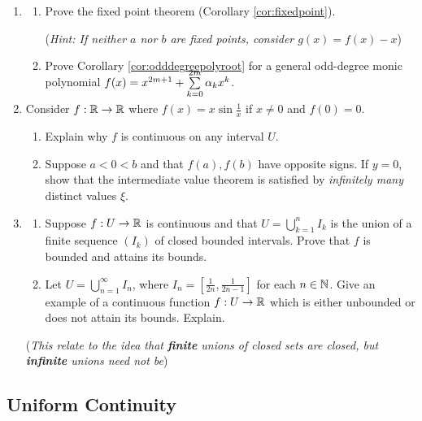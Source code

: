 \begin{exercises}{}{}
\begin{enumerate}
	  
	 	\item\begin{enumerate}
	 	  \item Prove the fixed point theorem (Corollary \ref{cor:fixedpoint}).\par
	 	  (\emph{Hint: If neither $a$ nor $b$ are fixed points, consider $g(x)=f(x)-x$}) 
	 	  
	 	  \item Prove Corollary \ref{cor:odddegreepolyroot} for a general odd-degree monic polynomial $f(x)=x^{2m+1}+\smash{\sum\limits_{k=0}^{2m}\alpha_kx^k}$. 
	 	\end{enumerate}
	 	

		\item Consider $f:\mathbb{R}\to\mathbb{R}$ where $f(x)=x\sin\frac 1x$ if $x\neq 0$ and $f(0)=0$.
		\begin{enumerate}
		  \item Explain why $f$ is continuous on any interval $U$.
		  \item Suppose $a<0<b$ and that $f(a),f(b)$ have opposite signs. If $y=0$, show that the intermediate value theorem is satisfied by \emph{infinitely many} distinct values $\xi$.
		\end{enumerate}
		
		
		\item\begin{enumerate}
		  \item Suppose $f:U\to\mathbb{R}$ is continuous and that $U=\bigcup\limits_{k=1}^nI_k$ is the union of a finite sequence $(I_k)$ of closed bounded intervals. Prove that $f$ is bounded and attains its bounds.
		  
		  \item Let $U=\bigcup\limits_{n=1}^\infty I_n$, where $I_n=[\frac 1{2n},\frac 1{2n-1}]$ for each $n\in\mathbb{N}$. Give an example of a continuous function $f:U\to\mathbb{R}$ which is either unbounded or does not attain its bounds. Explain.
		\end{enumerate}
		(\emph{This relate to the idea that \textbf{finite} unions of closed sets are closed, but \textbf{infinite} unions need not be})
	\end{enumerate}
\end{exercises}



\clearpage


\subsection{Uniform Continuity}\label{sec:uniformcont}

